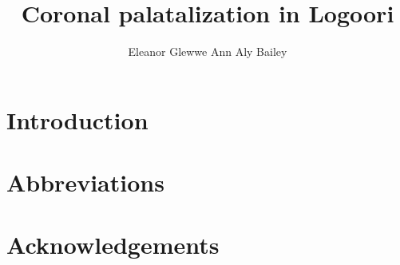 \documentclass[output=paper]{langsci/langscibook}
\title{Coronal palatalization in Logoori}
\author{%
 Eleanor Glewwe\affiliation{}\lastand 
 Ann Aly Bailey \affiliation{}
}
\begin{document}
\section{Introduction} 

\section*{Abbreviations}
\section*{Acknowledgements}

\printbibliography[heading=subbibliography,notkeyword=this]
\end{document}
